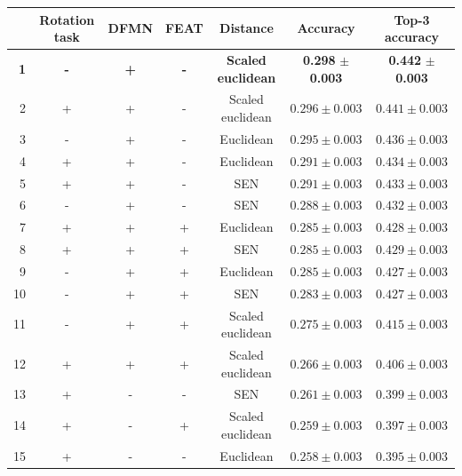 \documentclass[a4paper, 12pt]{report}
\begin{document}
 \begin{table}[h!]
\begin{adjustbox}{center}
\begin{tabular}{| r | c c c c | c |  c | }
\hline
    & Rotation task   & DFMN   & FEAT   & Distance         & Accuracy         & Top-3 accuracy   \\
    \hline
  \textbf{1} & \textbf{-} & \textbf{+} & \textbf{-} & \textbf{Scaled} \textbf{euclidean} & \textbf{0.298} $\pm$ \textbf{0.003} & \textbf{0.442} $\pm$ \textbf{0.003} \\
    \hline
  2 & +               & +      & -      & Scaled euclidean & $0.296 \pm 0.003$ & $0.441 \pm 0.003$ \\
    \hline
  3 & -               & +      & -      & Euclidean        & $0.295 \pm 0.003$ & $0.436 \pm 0.003$ \\
    \hline
  4 & +               & +      & -      & Euclidean        & $0.291 \pm 0.003$ & $0.434 \pm 0.003$ \\
    \hline
  5 & +               & +      & -      & SEN              & $0.291 \pm 0.003$ & $0.433 \pm 0.003$ \\
    \hline
  6 & -               & +      & -      & SEN              & $0.288 \pm 0.003$ & $0.432 \pm 0.003$ \\
    \hline
  7 & +               & +      & +      & Euclidean        & $0.285 \pm 0.003$ & $0.428 \pm 0.003$ \\
    \hline
  8 & +               & +      & +      & SEN              & $0.285 \pm 0.003$ & $0.429 \pm 0.003$ \\
    \hline
  9 & -               & +      & +      & Euclidean        & $0.285 \pm 0.003$ & $0.427 \pm 0.003$ \\
    \hline
 10 & -               & +      & +      & SEN              & $0.283 \pm 0.003$ & $0.427 \pm 0.003$ \\
    \hline
 11 & -               & +      & +      & Scaled euclidean & $0.275 \pm 0.003$ & $0.415 \pm 0.003$ \\
    \hline
 12 & +               & +      & +      & Scaled euclidean & $0.266 \pm 0.003$ & $0.406 \pm 0.003$ \\
    \hline
 13 & +               & -      & -      & SEN              & $0.261 \pm 0.003$ & $0.399 \pm 0.003$ \\
    \hline
 14 & +               & -      & +      & Scaled euclidean & $0.259 \pm 0.003$ & $0.397 \pm 0.003$ \\
    \hline
 15 & +               & -      & -      & Euclidean        & $0.258 \pm 0.003$ & $0.395 \pm 0.003$ \\

\end{tabular}
\end{adjustbox}
\end{table}
\end{document}
